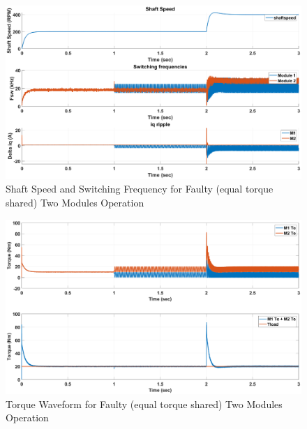 \documentclass{article}
\begin{document}
\begin{figure}[H]
\centering
\includegraphics[scale=0.35]{SimulationResults/two_modules/faulty_torqueshared/speed_fsw_iqripple.eps}
\caption{Shaft Speed and Switching Frequency for Faulty (equal torque shared) Two Modules Operation}
\label{fig:ShaftSpeedFswIqRippleTwoModulesFaultyEqualTorque}
\end{figure}

\begin{figure}[H]
\centering
\includegraphics[scale=0.35]{SimulationResults/two_modules/faulty_torqueshared/tref_tload.eps}
\caption{Torque Waveform for Faulty (equal torque shared) Two Modules Operation}
\label{fig:TorqueTwoModulesFaultyEqualTorque}
\end{figure}
\end{document}
